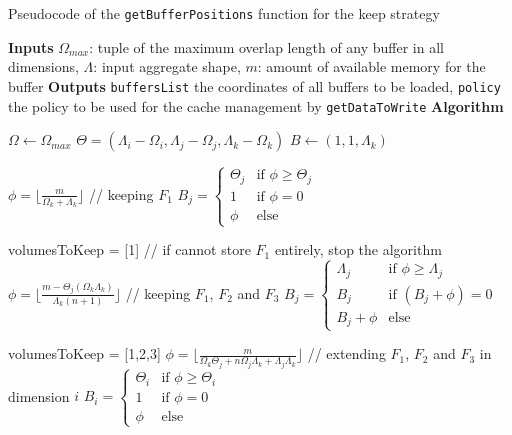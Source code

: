 \documentclass[conference]{IEEEtran}
\begin{document}
\begin{algorithm}
  \caption{Pseudocode of the \texttt{getBufferPositions} function for the keep strategy}
  \label{algo:getbuffersposition}
  \begin{algorithmic}[1]
  \STATE \textbf{Inputs}
  \STATE $\Omega_{max}$: tuple of the maximum overlap length
  of any buffer in all dimensions,
  \STATE $\Lambda$: input aggregate shape,
  \STATE $m$: amount of available memory for the buffer
  \STATE
  \STATE \textbf{Outputs}
  \STATE \texttt{buffersList} the coordinates of all buffers to be loaded,
  \STATE \texttt{policy} the policy to be used for the cache management by \texttt{getDataToWrite}
  \STATE
  \STATE \textbf{Algorithm}

  \STATE $\Omega \leftarrow \Omega_{max}$
  \STATE $\Theta = (\Lambda_i - \Omega_i, \Lambda_j - \Omega_j, \Lambda_k - \Omega_k)$
  \STATE $B \leftarrow (1,1,\Lambda_k)$

  \STATE $\phi = \lfloor \frac{m}{\Omega_k + \Lambda_k} \rfloor$ // keeping $F_1$
  \STATE $B_j = \begin{cases}
    \Theta_j & \textrm{if }\phi \geq \Theta_j \\
    1 & \textrm{if }\phi = 0 \\
    \phi & \textrm{else}
  \end{cases}$

    \STATE volumesToKeep = [1] // if cannot store $F_1$ entirely, stop the algorithm
  \ELSE
    \STATE $\phi = \lfloor \frac{m-\Theta_j(\Omega_k\Lambda_k)}{\Lambda_k(n+1)} \rfloor$  // keeping $F_1$, $F_2$ and $F_3$
    \STATE $B_j = \begin{cases}
      \Lambda_j & \textrm{if }\phi \geq \Lambda_j \\
      B_j & \textrm{if }(B_j+\phi) = 0 \\
      B_j + \phi & \textrm{else}
    \end{cases}$

      \STATE volumesToKeep = [1,2,3]
    \ELSE
      \STATE $\phi = \lfloor \frac{m}{\Omega_k\Theta_j + n\Omega_j\Lambda_k + \Lambda_j\Lambda_k} \rfloor$ // extending $F_1$, $F_2$ and $F_3$ in dimension $i$
      \STATE $B_i = \begin{cases}
        \Theta_i & \textrm{if }\phi \geq \Theta_i \\
        1 & \textrm{if }\phi = 0 \\
        \phi & \textrm{else}
      \end{cases}$


\end{algorithmic}
\end{algorithm}
\end{document}
